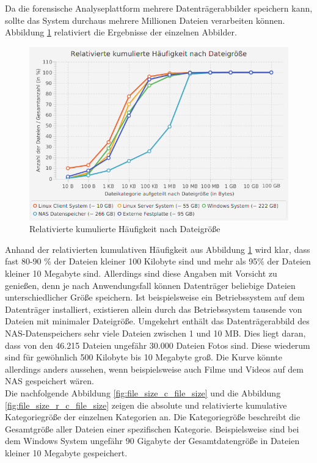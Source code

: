 \noindent
Da die forensische Analyseplattform mehrere Datenträgerabbilder speichern kann, sollte das System durchaus mehrere Millionen Dateien verarbeiten können. Abbildung \ref{fig:file_size_r_c_amount} relativiert die Ergebnisse der einzelnen Abbilder.\\

 \begin{figure}[ht]
  \centering
  \includegraphics[width=\textwidth]{./resource/fileSize_relativeCumulatedAmount.png}
  \caption{Relativierte kumulierte Häufigkeit nach Dateigröße}
  \label{fig:file_size_r_c_amount}
\end{figure}

\noindent
Anhand der relativierten kumulativen Häufigkeit aus Abbildung \ref{fig:file_size_r_c_amount} wird klar, dass fast 80-90 \% der Dateien kleiner 100 Kilobyte sind und mehr als 95\% der Dateien kleiner 10 Megabyte sind. Allerdings sind diese Angaben mit Vorsicht zu genießen, denn je nach Anwendungsfall können Datenträger beliebige Dateien unterschiedlicher Größe speichern. Ist beispielsweise ein Betriebssystem auf dem Datenträger installiert, existieren allein durch das Betriebssystem tausende von Dateien mit minimaler Dateigröße. Umgekehrt enthält das Datenträgerabbild des NAS-Datenspeichers sehr viele Dateien zwischen 1 und 10 MB. Dies liegt daran, dass von den 46.215 Dateien ungefähr 30.000 Dateien Fotos sind. Diese wiederum sind für gewöhnlich 500 Kilobyte bis 10 Megabyte groß. Die Kurve könnte allerdings anders aussehen, wenn beispielsweise auch Filme und Videos auf dem NAS gespeichert wären.\\

\noindent
Die nachfolgende Abbildung \ref{fig:file_size_c_file_size} und die Abbildung \ref{fig:file_size_r_c_file_size} zeigen die absolute und relativierte kumulative Kategoriegröße der einzelnen Kategorien an. Die Kategoriegröße beschreibt die Gesamtgröße aller Dateien einer spezifischen Kategorie. Beispielsweise sind bei dem Windows System ungefähr 90 Gigabyte der Gesamtdatengröße in Dateien kleiner 10 Megabyte gespeichert.\\  

